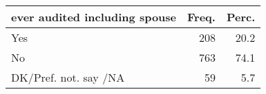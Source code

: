 \begin{table}[ht]
\centering
\begin{tabular}{lrr}
  \hline
ever audited including spouse & Freq. & Perc. \\ 
  \hline
Yes & 208 & 20.2 \\ 
  No & 763 & 74.1 \\ 
  DK/Pref. not. say /NA & 59 & 5.7 \\ 
   \hline
\end{tabular}
\end{table}
